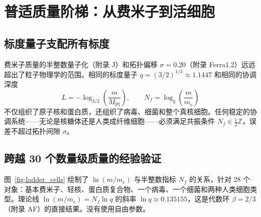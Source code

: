 \documentclass[11pt,a4paper]{article}
\begin{document}
	\section{普适质量阶梯：从费米子到活细胞}
	\label{sec:ladder_cells}
	
	\subsection{标度量子支配所有标度}
	
	费米子质量的半整数量子化（附录 J）和拓扑偏移 \(\sigma = 0.20\)（附录 Ferra1.2）远远超出了粒子物理学的范围。相同的标度量子 \(q = (3/2)^{1/3} \approx 1.1447\) 和相同的协调深度
	\[
	L = -\log_{3/2}\left(\frac{m}{M_{\mathrm{Pl}}}\right), \qquad
	N_f = \log_q\left(\frac{m}{m_e}\right)
	\]
	不仅组织了原子核和蛋白质，还组织了病毒、细菌和整个真核细胞。任何稳定的协调系统——无论是核糖体还是人类成纤维细胞——必须满足共振条件 \(N_f \in \frac{1}{2}\mathbb{Z}\)，误差不超过拓扑间隙 \(\sigma\)。
	
	\subsection{跨越 30 个数量级质量的经验验证}
	
	图~\ref{fig:ladder_cells} 绘制了 \(\ln(m/m_e)\) 与半整数指标 \(N_f\) 的关系，针对 28 个对象：基本费米子、轻核、蛋白质复合物、一个病毒、一个细菌和两种人类细胞类型。理论线 \(\ln(m/m_e) = N_f \ln q\) 的斜率 \(\ln q \approx 0.135155\)，这是代数环 \(\beta = 2/3\)（附录 AF）的直接结果。没有使用自由参数。
	
\end{document}
